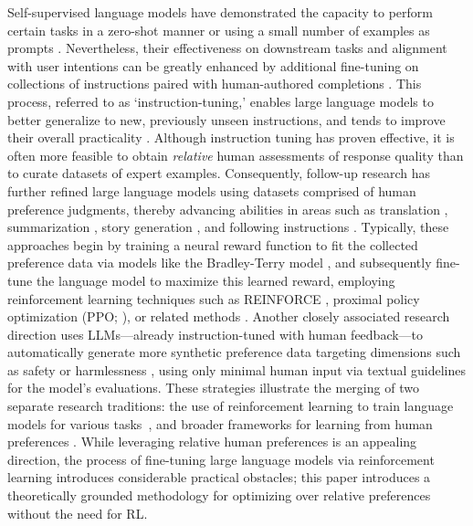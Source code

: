 Self-supervised language models have demonstrated the capacity to perform certain tasks in a zero-shot manner \citep{radford2019language} or using a small number of examples as prompts \citep{gpt3,megatron,chowdhery2022palm}. Nevertheless, their effectiveness on downstream tasks and alignment with user intentions can be greatly enhanced by additional fine-tuning on collections of instructions paired with human-authored completions \citep{mishra-etal-2022-cross,sanh2022multitask,chung2022scaling,thoppilan2022lamda}. This process, referred to as `instruction-tuning,' enables large language models to better generalize to new, previously unseen instructions, and tends to improve their overall practicality \citep{chung2022scaling}. Although instruction tuning has proven effective, it is often more feasible to obtain \textit{relative} human assessments of response quality than to curate datasets of expert examples. Consequently, follow-up research has further refined large language models using datasets comprised of human preference judgments, thereby advancing abilities in areas such as translation \citep{kreutzer-etal-2018-reliability}, summarization \citep{stiennon2022learning,ziegler2020finetuning}, story generation \citep{ziegler2020finetuning}, and following instructions \citep{ouyang2022training,ramamurthy2023is}. Typically, these approaches begin by training a neural reward function to fit the collected preference data via models like the Bradley-Terry model \citep{bradley1952rankanalysis}, and subsequently fine-tune the language model to maximize this learned reward, employing reinforcement learning techniques such as REINFORCE \citep{williams1992reinforce}, proximal policy optimization (PPO; \cite{schulman2017proximal}), or related methods \citep{ramamurthy2023is}. Another closely associated research direction uses LLMs—already instruction-tuned with human feedback—to automatically generate more synthetic preference data targeting dimensions such as safety or harmlessness \citep{bai2022constitutional}, using only minimal human input via textual guidelines for the model’s evaluations. These strategies illustrate the merging of two separate research traditions: the use of reinforcement learning to train language models for various tasks~\citep{Ranzato2015SequenceLT,paulus2018a,wu2018learning}, and broader frameworks for learning from human preferences \citep{christiano2017deep,kupcsik2018learning}. While leveraging relative human preferences is an appealing direction, the process of fine-tuning large language models via reinforcement learning introduces considerable practical obstacles; this paper introduces a theoretically grounded methodology for optimizing over relative preferences without the need for RL.

